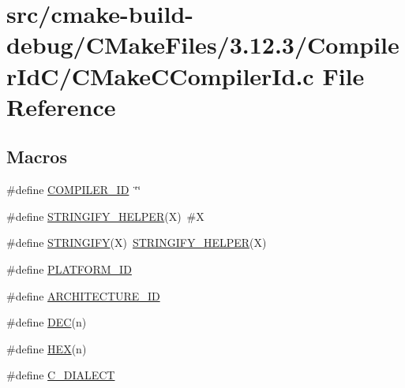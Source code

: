 \hypertarget{cmake-build-debug_2CMakeFiles_23_812_83_2CompilerIdC_2CMakeCCompilerId_8c}{}\section{src/cmake-\/build-\/debug/\+C\+Make\+Files/3.12.3/\+Compiler\+Id\+C/\+C\+Make\+C\+Compiler\+Id.c File Reference}
\label{cmake-build-debug_2CMakeFiles_23_812_83_2CompilerIdC_2CMakeCCompilerId_8c}
\subsection*{Macros}
\begin{DoxyCompactItemize}
\item 
\#define \hyperlink{cmake-build-debug_2CMakeFiles_23_812_83_2CompilerIdC_2CMakeCCompilerId_8c_a81dee0709ded976b2e0319239f72d174}{C\+O\+M\+P\+I\+L\+E\+R\+\_\+\+ID}~\char`\"{}\char`\"{}
\item 
\#define \hyperlink{cmake-build-debug_2CMakeFiles_23_812_83_2CompilerIdC_2CMakeCCompilerId_8c_a2ae9b72bb13abaabfcf2ee0ba7d3fa1d}{S\+T\+R\+I\+N\+G\+I\+F\+Y\+\_\+\+H\+E\+L\+P\+ER}(X)~\#X
\item 
\#define \hyperlink{cmake-build-debug_2CMakeFiles_23_812_83_2CompilerIdC_2CMakeCCompilerId_8c_a43e1cad902b6477bec893cb6430bd6c8}{S\+T\+R\+I\+N\+G\+I\+FY}(X)~\hyperlink{cmake-build-release_2CMakeFiles_23_812_83_2CompilerIdCXX_2CMakeCXXCompilerId_8cpp_a2ae9b72bb13abaabfcf2ee0ba7d3fa1d}{S\+T\+R\+I\+N\+G\+I\+F\+Y\+\_\+\+H\+E\+L\+P\+ER}(X)
\item 
\#define \hyperlink{cmake-build-debug_2CMakeFiles_23_812_83_2CompilerIdC_2CMakeCCompilerId_8c_adbc5372f40838899018fadbc89bd588b}{P\+L\+A\+T\+F\+O\+R\+M\+\_\+\+ID}
\item 
\#define \hyperlink{cmake-build-debug_2CMakeFiles_23_812_83_2CompilerIdC_2CMakeCCompilerId_8c_aba35d0d200deaeb06aee95ca297acb28}{A\+R\+C\+H\+I\+T\+E\+C\+T\+U\+R\+E\+\_\+\+ID}
\item 
\#define \hyperlink{cmake-build-debug_2CMakeFiles_23_812_83_2CompilerIdC_2CMakeCCompilerId_8c_ad1280362da42492bbc11aa78cbf776ad}{D\+EC}(n)
\item 
\#define \hyperlink{cmake-build-debug_2CMakeFiles_23_812_83_2CompilerIdC_2CMakeCCompilerId_8c_a46d5d95daa1bef867bd0179594310ed5}{H\+EX}(n)
\item 
\#define \hyperlink{cmake-build-debug_2CMakeFiles_23_812_83_2CompilerIdC_2CMakeCCompilerId_8c_a07f8e5783674099cd7f5110e22a78cdb}{C\+\_\+\+D\+I\+A\+L\+E\+CT}
\end{DoxyCompactItemize}

